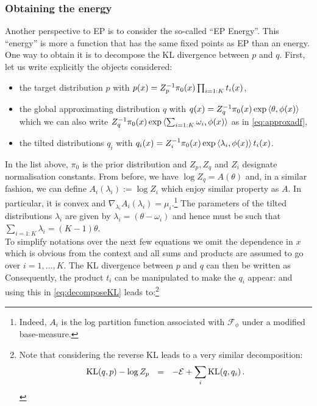 \subsubsection*{Obtaining the energy}
Another perspective to EP is to consider the so-called ``EP Energy''. This ``energy'' is more a function that has the same fixed points as EP than an energy. One way to obtain it is to decompose the KL divergence between $p$ and $q$. First, let us write explicitly the objects considered:
\begin{itemize}\itsepa
	\item the target distribution $p$ with $p(x)=Z_p^{-1} \pi_0(x)\prod_{i=1:K}t_i(x)$,
	\item the global approximating distribution $q$ with $q(x)=Z_q^{-1} \pi_0(x)\exp\left\langle \theta,\phi(x) \right\rangle$ which we can also write $Z_q^{-1} \pi_0(x)\exp\left\langle \sum_{i=1:K}\omega_i,\phi(x) \right\rangle$ as in \eqref{eq:approxadf},
	\item the tilted distributions $q_i$ with $q_i(x)=Z_i^{-1} \pi_0(x)\exp\left\langle \lambda_i,\phi(x) \right\rangle t_i(x)$.
\end{itemize}
In the list above, $\pi_0$ is the prior distribution and $Z_p,Z_q$ and $Z_i$ designate normalisation constants. From before, we have $\log Z_q=A(\theta)$ and, in a similar fashion, we can define $A_i(\lambda_i):=\log Z_i$ which enjoy similar property as $A$. In particular, it is convex and $\nabla_{\lambda_i} A_i(\lambda_i) =\mu_{i}$.\footnote{Indeed, $A_i$ is the log partition function associated with $\mathcal F_\phi$ under a modified base-measure.} The parameters of the tilted distributions $\lambda_i$ are given by $\lambda_i=(\theta-\omega_i)$ and hence must be such that $\sum_{i=1:K}\lambda_i=(K-1)\theta$.\\
To simplify notations over the next few equations we omit the dependence in $x$ which is obvious from the context and all sums and products are assumed to go over $i=1,\dots,K$. The KL divergence between $p$ and $q$ can then be written as
%
%	
Consequently, the product $t_i$ can be manipulated to make the $q_i$ appear:
%
%
and using this in \eqref{eq:decomposeKL} leads to:\footnote{Note that considering the reverse KL leads to a very similar decomposition:
\[\mathrm{KL}\!\left(q,p\right) - \log Z_p \quad\!\!=\quad\!\! -\mathcal E + \sum_i \mathrm{KL}\!\left(q,q_i\right).\]}
